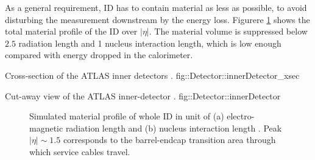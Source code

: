 
%
As a general requirement, ID has to contain material as less as possible, to avoid disturbing the measurement downstream by the energy loss. 
Figurere \ref{fig::Detector::IDmaterial} shows the total material profile of the ID over $|\eta|$. 
The material volume is suppressed below $2.5$ radiation length and 1 nucleus interaction length, which is low enough compared with energy dropped in the calorimeter.


{Cross-section of the ATLAS inner detectors \cite{ATLAS_exp}.}
{fig::Detector::innerDetector_xsec}


{Cut-away view of the ATLAS inner-detector \cite{ATLAS_exp}.}
{fig::Detector::innerDetector}

\begin{figure}[h]
  \centering
    \caption{ Simulated material profile of whole ID in unit of (a) electro-magnetic radiation length and (b) nucleus interaction length \cite{ATLAS_exp}.
      Peak $|\eta|\sim 1.5$ corresponds to the barrel-endcap transition area through which service cables travel.
      \label{fig::Detector::IDmaterial} }
\end{figure}



